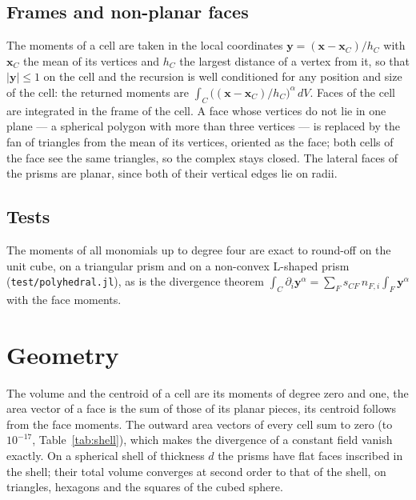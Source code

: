 \documentclass[preprint,12pt]{elsarticle}
\newcommand{\bx}{\mathbf{x}}
\newcommand{\by}{\mathbf{y}}
\newcommand{\code}[1]{\texttt{#1}}
\theoremstyle{definition}
\begin{document}
\subsection{Frames and non-planar faces}
The moments of a cell are taken in the local coordinates $\by=(\bx-\bx_C)/h_C$ with $\bx_C$ the mean
of its vertices and $h_C$ the largest distance of a vertex from it, so that $|\by|\le1$ on the cell
and the recursion is well conditioned for any position and size of the cell: the returned moments are
$\int_C \big((\bx-\bx_C)/h_C\big)^\alpha\,dV$. Faces of the cell are integrated in the frame of the
cell. A face whose vertices do not lie in one plane --- a spherical polygon with more than three
vertices --- is replaced by the fan of triangles from the mean of its vertices, oriented as the face;
both cells of the face see the same triangles, so the complex stays closed. The lateral faces of the
prisms are planar, since both of their vertical edges lie on radii.

\subsection{Tests}
The moments of all monomials up to degree four are exact to round-off on the unit cube, on a
triangular prism and on a non-convex L-shaped prism (\code{test/polyhedral.jl}), as is the divergence
theorem $\int_C\partial_i\by^\alpha = \sum_F s_{CF}\, n_{F,i}\int_F\by^\alpha$ with the face moments.

\section{Geometry}\label{sec:geometry}

The volume and the centroid of a cell are its moments of degree zero and one, the area vector of a
face is the sum of those of its planar pieces, its centroid follows from the face moments. The
outward area vectors of every cell sum to zero (to $10^{-17}$, Table~\ref{tab:shell}), which makes the
divergence of a constant field vanish exactly. On a spherical shell of thickness $d$ the prisms have
flat faces inscribed in the shell; their total volume converges at second order to that of the shell,
on triangles, hexagons and the squares of the cubed sphere.
\end{document}

